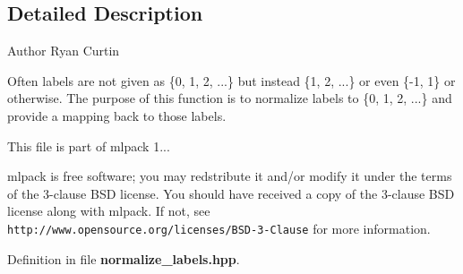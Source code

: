 \subsection{Detailed Description}
\begin{DoxyAuthor}{Author}
Ryan Curtin
\end{DoxyAuthor}
Often labels are not given as \{0, 1, 2, ...\} but instead \{1, 2, ...\} or even \{-\/1, 1\} or otherwise. The purpose of this function is to normalize labels to \{0, 1, 2, ...\} and provide a mapping back to those labels.

This file is part of mlpack 1...

mlpack is free software; you may redstribute it and/or modify it under the terms of the 3-\/clause B\-S\-D license. You should have received a copy of the 3-\/clause B\-S\-D license along with mlpack. If not, see {\tt http\-://www.\-opensource.\-org/licenses/\-B\-S\-D-\/3-\/\-Clause} for more information. 

Definition in file {\bf normalize\-\_\-labels.\-hpp}.


